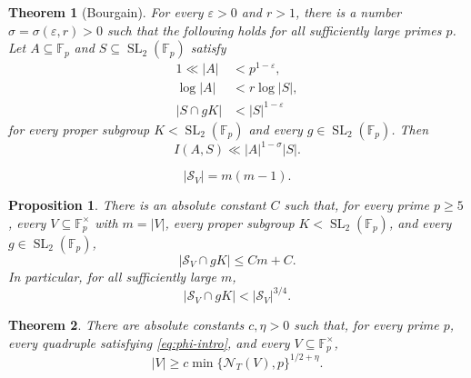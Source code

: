 \documentclass[10pt,a4paper]{amsart}
\newtheorem{theorem}{Theorem}
\newtheorem{proposition}{Proposition}
\newcommand{\F}{\mathbb F}
\newcommand{\SL}{\operatorname{SL}}
\newcommand{\cN}{\mathcal N}
\newcommand{\cS}{\mathcal S}
\begin{document}
\begin{theorem}[Bourgain]\label{thm:bourgain}
For every $\varepsilon>0$ and $r>1$, there is a number $\sigma=\sigma(\varepsilon,r)>0$ such that the following holds for all sufficiently large primes $p$.  Let $A\subseteq\F_p$ and $S\subseteq\SL_2(\F_p)$ satisfy
\begin{align}
  1\ll |A|&<p^{1-\varepsilon},\label{eq:bourgain-size-A}\\
  \log|A|&<r\log|S|,\label{eq:bourgain-size-S}\\
  |S\cap gK|&<|S|^{1-\varepsilon}\label{eq:bourgain-nonconc}
\end{align}
for every proper subgroup $K<\SL_2(\F_p)$ and every $g\in\SL_2(\F_p)$.  Then
\begin{equation}\label{eq:bourgain-conclusion}
  I(A,S)\ll |A|^{1-\sigma}|S|.
\end{equation}
\end{theorem}

\begin{equation}\label{eq:S-size-exact}
  |\cS_V|=m(m-1).
\end{equation}

\begin{proposition}\label{prop:subgroup-escape}
There is an absolute constant $C$ such that, for every prime $p\ge5$, every $V\subseteq\F_p^\times$ with $m=|V|$, every proper subgroup $K<\SL_2(\F_p)$, and every $g\in\SL_2(\F_p)$,
\begin{equation}\label{eq:subgroup-escape}
  |\cS_V\cap gK|\le Cm+C.
\end{equation}
In particular, for all sufficiently large $m$,
\begin{equation}\label{eq:subgroup-escape-power}
  |\cS_V\cap gK|<|\cS_V|^{3/4}.
\end{equation}
\end{proposition}

\begin{theorem}\label{thm:abstract-intro}
There are absolute constants $c,\eta>0$ such that, for every prime $p$, every quadruple satisfying \eqref{eq:phi-intro}, and every $V\subseteq\F_p^\times$,
\begin{equation}\label{eq:abstract-intro}
  |V|\ge c\min\{\cN_T(V),p\}^{1/2+\eta}.
\end{equation}
\end{theorem}
\end{document}

